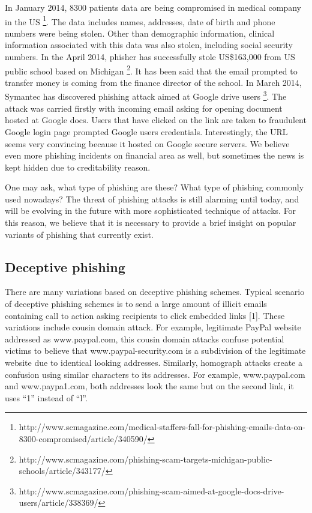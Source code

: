 In January 2014, 8300 patients data are being compromised in medical
company in the US%
\footnote{http://www.scmagazine.com/medical-staffers-fall-for-phishing-emails-data-on-8300-compromised/article/340590/%
}. The data includes names, addresses, date of birth and phone numbers
were being stolen. Other than demographic information, clinical information
associated with this data was also stolen, including social security
numbers. In the April 2014, phisher has successfully stole US\$163,000
from US public school based on Michigan%
\footnote{http://www.scmagazine.com/phishing-scam-targets-michigan-public-schools/article/343177/%
}. It has been said that the email prompted to transfer money is coming
from the finance director of the school. In March 2014, Symantec has
discovered phishing attack aimed at Google drive users%
\footnote{http://www.scmagazine.com/phishing-scam-aimed-at-google-docs-drive-users/article/338369/%
}. The attack was carried firstly with incoming email asking for opening
document hosted at Google docs. Users that have clicked on the link
are taken to fraudulent Google login page prompted Google users credentials.
Interestingly, the URL seems very convincing because it hosted on
Google secure servers. We believe even more phishing incidents on
financial area as well, but sometimes the news is kept hidden due
to creditability reason.

One may ask, what type of phishing are these? What type of phishing
commonly used nowadays? The threat of phishing attacks is still alarming
until today, and will be evolving in the future with more sophisticated
technique of attacks. For this reason, we believe that it is necessary
to provide a brief insight on popular variants of phishing that currently
exist. 


\subsection{Deceptive phishing}

There are many variations based on deceptive phishing schemes. Typical
scenario of deceptive phishing schemes is to send a large amount of
illicit emails containing call to action asking recipients to click
embedded links {[}1{]}. These variations include cousin domain attack.
For example, legitimate PayPal website addressed as www.paypal.com,
this cousin domain attacks confuse potential victims to believe that
www.paypal-security.com is a subdivision of the legitimate website
due to identical looking addresses. Similarly, homograph attacks create
a confusion using similar characters to its addresses. For example,
www.paypal.com and www.paypa1.com, both addresses look the same but
on the second link, it uses \textquotedblleft 1\textquotedblright{}
instead of \textquotedblleft l\textquotedblright . 

